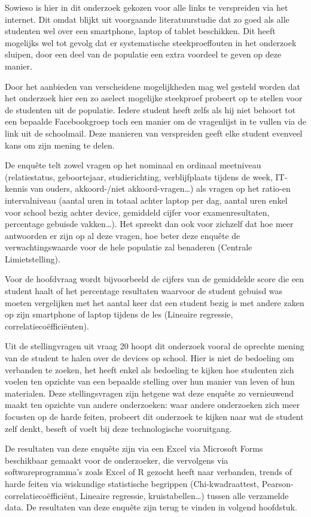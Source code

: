 Sowieso is hier in dit onderzoek gekozen voor alle links te verspreiden via het internet. Dit omdat blijkt uit voorgaande literatuurstudie dat zo goed als alle studenten wel over een smartphone, laptop of tablet beschikken. Dit heeft mogelijks wel tot gevolg dat er systematische steekproeffouten in het onderzoek sluipen, door een deel van de populatie een extra voordeel te geven op deze manier.

Door het aanbieden van verscheidene mogelijkheden mag wel gesteld worden dat het onderzoek hier een zo aselect mogelijke steekproef probeert op te stellen voor de studenten uit de populatie. Iedere student heeft zelfs als hij niet behoort tot een bepaalde Facebookgroep toch een manier om de vragenlijst in te vullen via de link uit de schoolmail. Deze manieren van verspreiden geeft elke student evenveel kans om zijn mening te delen.

De enquête telt zowel vragen op het nominaal en ordinaal meetniveau (relatiestatus, geboortejaar, studierichting, verblijfplaats tijdens de week, IT-kennis van ouders, akkoord-/niet akkoord-vragen…) als vragen op het ratio-en intervalniveau (aantal uren in totaal achter laptop per dag, aantal uren enkel voor school bezig achter device, gemiddeld cijfer voor examenresultaten, percentage gebuisde vakken…). Het spreekt dan ook voor zichzelf dat hoe meer antwoorden er zijn op al deze vragen, hoe beter deze enquête de verwachtingswaarde voor de hele populatie zal benaderen (Centrale Limietstelling).

Voor de hoofdvraag wordt bijvoorbeeld de cijfers van de gemiddelde score die een student haalt of het percentage resultaten waarvoor de student gebuisd was moeten vergelijken met het aantal keer dat een student bezig is met andere zaken op zijn smartphone of laptop tijdens de les (Lineaire regressie, correlatiecoëfficiënten).

Uit de stellingvragen uit vraag 20 hoopt dit onderzoek vooral de oprechte mening van de student te halen over de devices op school. Hier is niet de bedoeling om verbanden te zoeken, het heeft enkel als bedoeling te kijken hoe studenten zich voelen ten opzichte van een bepaalde stelling over hun manier van leven of hun materialen. Deze stellingsvragen zijn hetgene wat deze enquête zo vernieuwend maakt ten opzichte van andere onderzoeken: waar andere onderzoeken zich meer focusten op de harde feiten, probeert dit onderzoek te kijken naar wat de student zelf denkt, beseft of voelt bij deze technologische vooruitgang.

De resultaten van deze enquête zijn via een Excel via Microsoft Forms beschikbaar gemaakt voor de onderzoeker, die vervolgens via softwareprogramma’s zoals Excel of R gezocht heeft naar verbanden, trends of harde feiten via wiskundige statistische begrippen (Chi-kwadraattest, Pearson-correlatiecoëfficiënt, Lineaire regressie, kruistabellen…) tussen alle verzamelde data. De resultaten van deze enquête zijn terug te vinden in volgend hoofdstuk.

